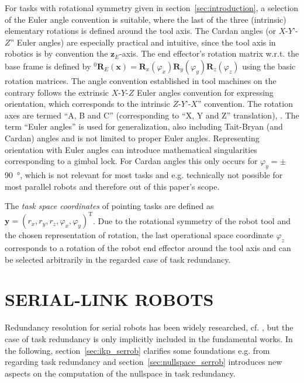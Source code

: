 \documentclass[a4paper,twoside]{article}
\newcommand{\transp}[0]{{\mathrm{T}}}
\newcommand{\rotmat}[2]{{{ }^{#1}\boldsymbol{R}}_{#2}}
\begin{document}
For tasks with rotational symmetry given in section~\ref{sec:introduction}, a selection of the Euler angle convention is suitable, where the last of the three (intrinsic) elementary rotations is defined around the tool axis.
The Cardan angles (or $X$-$Y$'-$Z$'' Euler angles) are especially practical and intuitive, since the tool axis in robotics is by convention the $\bm{z}_E$-axis. 
The end effector's rotation matrix w.r.t. the base frame is defined by $\rotmat{0}{E}(\bm{x})=\bm{R}_x(\varphi_x) \bm{R}_y(\varphi_y) \bm{R}_z(\varphi_z)$ using the basic rotation matrices.
The angle convention established in tool machines on the contrary follows the extrinsic $X$-$Y$-$Z$ Euler angles convention for expressing orientation, which corresponds to the intrinsic $Z$\nobreakdash-$Y$'\nobreakdash-$X$'' convention.
The rotation axes are termed ``A, B and C'' (corresponding to ``X, Y and Z'' translation), \cite{SmirnovPlyMir2013}.
The term ``Euler angles'' is used for generalization, also including Tait-Bryan (and Cardan) angles and is not limited to proper Euler angles.
Representing orientation with Euler angles can introduce mathematical singularities corresponding to a gimbal lock.
For Cardan angles this only occurs for $\varphi_y{=}\pm$\SI{90}{\degree}, which is not relevant for most tasks and e.g. technically not possible for most parallel robots and therefore out of this paper's scope.

The \emph{task space coordinates} of pointing tasks are defined as ${\bm{y}=(r_x,r_y,r_z,\varphi_x,\varphi_y)^\transp}$.
Due to the rotational symmetry of the robot tool and the chosen representation of rotation, the last operational space coordinate $\varphi_z$ corresponds to a rotation of the robot end effector around the tool axis and can be selected arbitrarily in the regarded case of task redundancy.

\section{\uppercase{Serial-Link Robots}}
\label{sec:serrob}

Redundancy resolution for serial robots has been widely researched, cf. \cite{ChiaveriniOriWal2008}, but the case of task redundancy is only implicitly included in the fundamental works.
%
In the following, section~\ref{sec:ikp_serrob} clarifies some foundations e.g. from \cite{ChiaveriniOriWal2008} regarding task redundancy and section~\ref{sec:nullspace_serrob} introduces new aspects on the computation of the nullspace in task redundancy.
\end{document}
